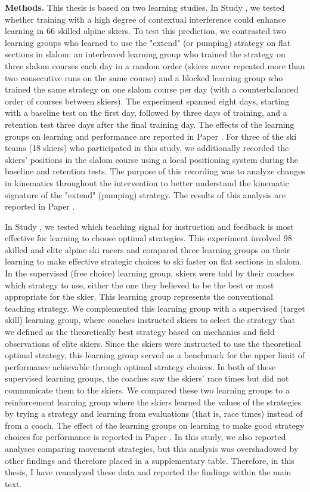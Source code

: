 \textbf{Methods.} This thesis is based on two learning studies. In Study , we tested whether training with a high degree of contextual interference could enhance learning in 66 skilled alpine skiers. To test this prediction, we contrasted two learning groups who learned to use the "extend" (or pumping) strategy on flat sections in slalom: an interleaved learning group who trained the strategy on three slalom courses each day in a random order (skiers never repeated more than two consecutive runs on the same course) and a blocked learning group who trained the same strategy on one slalom course per day (with a counterbalanced order of courses between skiers). The experiment spanned eight days, starting with a baseline test on the first day, followed by three days of training, and a retention test three days after the final training day. The effects of the learning groups on learning and performance are reported in Paper . For three of the ski teams (18 skiers) who participated in this study, we additionally recorded the skiers' positions in the slalom course using a local positioning system during the baseline and retention tests. The purpose of this recording was to analyze changes in kinematics throughout the intervention to better understand the kinematic signature of the "extend" (pumping) strategy. The results of this analysis are reported in Paper .  

In Study , we tested which teaching signal for instruction and feedback is most effective for learning to choose optimal strategies. This experiment involved 98 skilled and elite alpine ski racers and compared three learning groups on their learning to make effective strategic choices to ski faster on flat sections in slalom. In the supervised (free choice) learning group, skiers were told by their coaches which strategy to use, either the one they believed to be the best or most appropriate for the skier. This learning group represents the conventional teaching strategy. We complemented this learning group with a supervised (target skill) learning group, where coaches instructed skiers to select the strategy that we defined as the theoretically best strategy based on mechanics and field observations of elite skiers. Since the skiers were instructed to use the theoretical optimal strategy, this learning group served as a benchmark for the upper limit of performance achievable through optimal strategy choices. In both of these supervised learning groups, the coaches saw the skiers’ race times but did not communicate them to the skiers. We compared these two learning groups to a reinforcement learning group where the skiers learned the values of the strategies by trying a strategy and learning from evaluations (that is, race times) instead of from a coach. The effect of the learning groups on learning to make good strategy choices for performance is reported in Paper . In this study, we also reported analyses comparing movement strategies, but this analysis was overshadowed by other findings and therefore placed in a supplementary table. Therefore, in this thesis, I have reanalyzed these data and reported the findings within the main text. 

